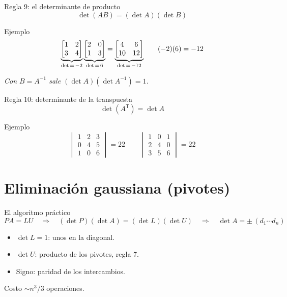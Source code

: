 \documentclass[aspectratio=169,11pt]{beamer}
\newcommand{\dt}[1]{\det #1}
\newcommand{\dbar}[1]{%
  \begin{vmatrix} #1 \end{vmatrix}%
}
\newcommand{\mat}[1]{%
  \begin{bmatrix} #1 \end{bmatrix}%
}
\newcommand{\remate}[1]{%
  \vspace{0.3em}
  \begin{center}\itshape\small #1\end{center}%
}
\begin{document}
\begin{frame}{Regla 9: el determinante de producto}
  \[
    \dt{(AB)} = (\dt{A})(\dt{B})
  \]

  \begin{block}{Ejemplo}
    \[
      \underbrace{\mat{1 & 2 \\ 3 & 4}}_{\dt{} \,=\, -2}
      \underbrace{\mat{2 & 0 \\ 1 & 3}}_{\dt{} \,=\, 6}
      = \underbrace{\mat{4 & 6 \\ 10 & 12}}_{\dt{} \,=\, -12}
      \qquad
      (-2)(6) = -12
    \]
  \end{block}

  \remate{Con $B = A^{-1}$ sale $(\dt{A})(\dt{A^{-1}}) = 1$.}
\end{frame}

\begin{frame}{Regla 10: determinante de la transpuesta}
  \[
    \dt{(A^{\mathsf{T}})} = \dt{A}
  \]

  \begin{block}{Ejemplo}
    \[
      \dbar{1 & 2 & 3 \\ 0 & 4 & 5 \\ 1 & 0 & 6} = 22
      \qquad
      \dbar{1 & 0 & 1 \\ 2 & 4 & 0 \\ 3 & 5 & 6} = 22
    \]
  \end{block}


\end{frame}

\section{Eliminación gaussiana (pivotes)}

\begin{frame}{El algoritmo práctico}
  \[
    PA = LU
    \quad\Longrightarrow\quad
    (\dt{P})(\dt{A}) = (\dt{L})(\dt{U})
    \quad\Longrightarrow\quad
    \dt{A} = \pm\,(d_1 \cdots d_n)
  \]

  \begin{itemize}
    \item $\dt{L} = 1$: unos en la diagonal.
    \item $\dt{U}$: producto de los pivotes, regla 7.
    \item Signo: paridad de los intercambios.
  \end{itemize}

  \begin{block}{Costo}
    $\sim n^3/3$ operaciones.
  \end{block}
\end{frame}
\end{document}
